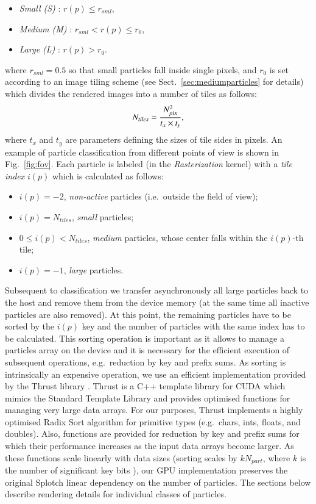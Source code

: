 \documentclass[preprint,5pt]{elsarticle}
\begin{document}
\begin{itemize}
\item
{\it Small (S)} : $r(p) \le r_{sml}$,
\item
{\it Medium (M)} : $r_{sml} < r(p) \le r_0$,
\item
{\it Large (L)} : $r(p) > r_0$.
\end{itemize}
where $r_{sml} = 0.5$ so that small particles fall inside single pixels, and 
$r_0$ is set according to an image tiling scheme (see Sect.~\ref{sec:mediumparticles} for details) which divides the rendered images
into a number of tiles as follows:  
\begin{equation}\label{tiles}
N_{tiles} = {N_{pix}^2\over t_x \times t_y},
\end{equation}
where $t_x$ and $t_y$ are parameters defining the sizes of tile sides in pixels.
An example of particle classification from different points of view is shown in Fig.~\ref{fig:fov}. Each particle is labeled (in the {\it Rasterization} kernel) with a {\it tile index} $i(p)$ which is calculated as follows:
\begin{itemize}
\item
$i(p) = -2$, {\it non-active} particles (i.e.\ outside the field of view);
\item
$i(p) = N_{tiles}$, {\it small} particles;
\item
$0 \le i(p) < N_{tiles}$, {\it medium} particles, whose center falls within the $i(p)$-th tile;
\item
$i(p) = -1$, {\it large} particles.
\end{itemize}

Subsequent to classification we transfer asynchronously all large particles back to the host and remove them from the device memory (at the same time all inactive particles are also removed). At this point, the remaining particles have to be sorted by the $i(p)$ key and the number of particles with the same index has to be calculated.
This sorting operation is important as it allows to manage a particles array on the device and it is  
necessary for the efficient execution of subsequent operations, e.g.\ reduction by key and prefix sums.
As sorting is intrinsically an expensive operation, we use an efficient implementation provided by the Thrust library \cite{thrusturl}. Thrust is a C++ template library for CUDA which mimics the Standard Template Library and provides optimised functions for managing very large data arrays. For our purposes, Thrust implements a highly optimised Radix Sort algorithm for primitive types (e.g.\ chars, ints, floats, and doubles). Also, functions are provided for reduction by key and prefix sums for which their performance increases as the input data arrays become larger. As these functions scale linearly with data sizes (sorting scales by $kN_{part}$, where $k$ is the number of significant key bits \cite{RadixSort}), our GPU implementation preserves the original Splotch linear dependency on the number of particles. The sections below describe rendering details for individual classes of particles.
\end{document}
